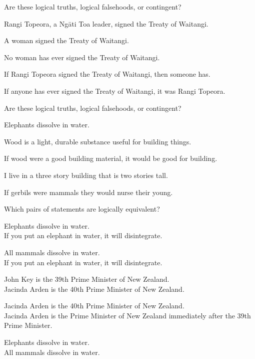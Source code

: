 \documentclass[PHIL101-Textbook.tex]{subfiles}
\begin{document}
\problempart
Are these logical truths, logical falsehoods, or contingent?
\begin{earg}
  \item Rangi Topeora, a Ng\={a}ti Toa leader, signed the Treaty of Waitangi.
\item A woman signed the Treaty of Waitangi.
\item No woman has ever signed the Treaty of Waitangi.
\item If Rangi Topeora signed the Treaty of Waitangi, then someone has.
\item If anyone has ever signed the Treaty of Waitangi, it was Rangi Topeora.
\end{earg}
\noindent\solutions\problempart\label{pr.EnglishTautology2}
Are these logical truths, logical falsehoods, or contingent?
\begin{earg}
\item Elephants dissolve in water.
\item Wood is a light, durable substance useful for building things.
\item If wood were a good building material, it would be good for building.
\item I live in a three story building that is two stories tall.
\item If gerbils were mammals they would nurse their young.
\end{earg}
\problempart 
Which pairs of statements are logically equivalent? 
\begin{earg}
\item Elephants dissolve in water.	\\
	If you put an elephant in water, it will disintegrate.
\item All mammals dissolve in water.\\		
	If you put an elephant in water, it will disintegrate. 
\item John Key is the 39th Prime Minister of New Zealand. \\
	 Jacinda Arden is the 40th Prime Minister of New Zealand. 
\item Jacinda Arden is the 40th Prime Minister of New Zealand. \\
	Jacinda Arden is the Prime Minister of New Zealand immediately after the 39th Prime Minister. 
\item Elephants dissolve in water. 	\\	
	All mammals dissolve in water. 
\end{earg}
\end{document}
